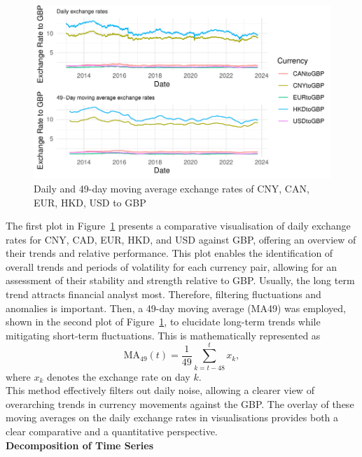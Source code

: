 \documentclass{article}\usepackage[]{graphicx}\usepackage[]{xcolor}
\makeatletter
\def\maxwidth{ %
  \ifdim\Gin@nat@width>\linewidth
    \linewidth
  \else
    \Gin@nat@width
  \fi
}
\newenvironment{knitrout}{}{} %
\makeatother
\begin{document}
\begin{figure}[H]
\begin{knitrout}
{\centering \includegraphics[width=\maxwidth]{figure/beamer-unnamed-chunk-2-1} 

}


\end{knitrout}
\centering
\caption{Daily and 49-day moving average exchange rates of CNY, CAN, EUR, HKD, USD to GBP}
\label{fig:all exchange rates}
\end{figure}

\noindent
The first plot in Figure~\ref{fig:all exchange rates} presents a comparative visualisation of daily exchange rates for CNY, CAD, EUR, HKD, and USD against GBP, offering an overview of their trends and relative performance. This plot enables the identification of overall trends and periods of volatility for each currency pair, allowing for an assessment of their stability and strength relative to GBP. Usually, the long term trend attracts financial analyst most. Therefore, filtering fluctuations and anomalies is important. Then, a 49-day moving average (MA49) was employed, shown in the second plot of Figure~\ref{fig:all exchange rates}, to elucidate long-term trends while mitigating short-term fluctuations. This is mathematically represented as 
\[\text{MA}_{49}(t) = \frac{1}{49} \sum_{k=t-48}^{t} x_k,\] 
where \( x_k \) denotes the exchange rate on day $k$.\\

\noindent
This method effectively filters out daily noise, allowing a clearer view of overarching trends in currency movements against the GBP. The overlay of these moving averages on the daily exchange rates in visualisations provides both a clear comparative and a quantitative perspective.\\

\noindent
\textbf{Decomposition of Time Series}\\
\end{document}
